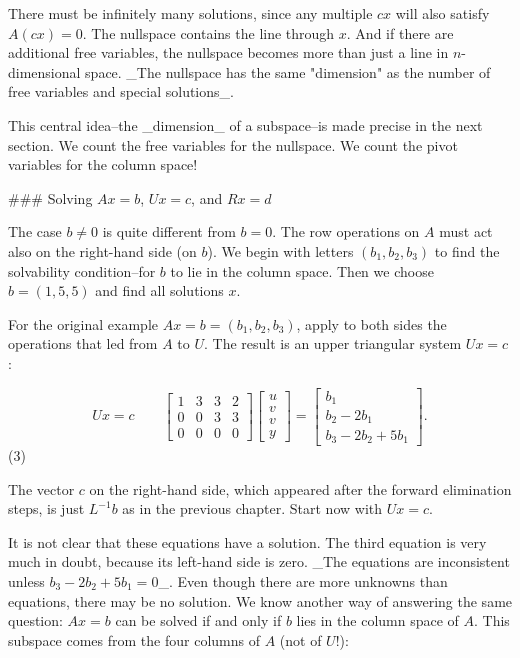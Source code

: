 There must be infinitely many solutions, since any multiple \(cx\) will also satisfy \(A(cx)=0\). The nullspace contains the line through \(x\). And if there are additional free variables, the nullspace becomes more than just a line in \(n\)-dimensional space. _The nullspace has the same "dimension" as the number of free variables and special solutions_.

This central idea--the _dimension_ of a subspace--is made precise in the next section. We count the free variables for the nullspace. We count the pivot variables for the column space!

### Solving \(Ax=b\), \(Ux=c\), and \(Rx=d\)

The case \(b\neq 0\) is quite different from \(b=0\). The row operations on \(A\) must act also on the right-hand side (on \(b\)). We begin with letters \((b_{1},b_{2},b_{3})\) to find the solvability condition--for \(b\) to lie in the column space. Then we choose \(b=(1,5,5)\) and find all solutions \(x\).

For the original example \(Ax=b=(b_{1},b_{2},b_{3})\), apply to both sides the operations that led from \(A\) to \(U\). The result is an upper triangular system \(Ux=c\):

\[Ux=c\qquad\begin{bmatrix}1&3&3&2\\ 0&0&3&3\\ 0&0&0&0\end{bmatrix}\begin{bmatrix}u\\ v\\ v\\ y\end{bmatrix}=\begin{bmatrix}b_{1}\\ b_{2}-2b_{1}\\ b_{3}-2b_{2}+5b_{1}\end{bmatrix}.\] (3)

The vector \(c\) on the right-hand side, which appeared after the forward elimination steps, is just \(L^{-1}b\) as in the previous chapter. Start now with \(Ux=c\).

It is not clear that these equations have a solution. The third equation is very much in doubt, because its left-hand side is zero. _The equations are inconsistent unless \(b_{3}-2b_{2}+5b_{1}=0\)_. Even though there are more unknowns than equations, there may be no solution. We know another way of answering the same question: \(Ax=b\) can be solved if and only if \(b\) lies in the column space of \(A\). This subspace comes from the four columns of \(A\) (not of \(U\)!):

